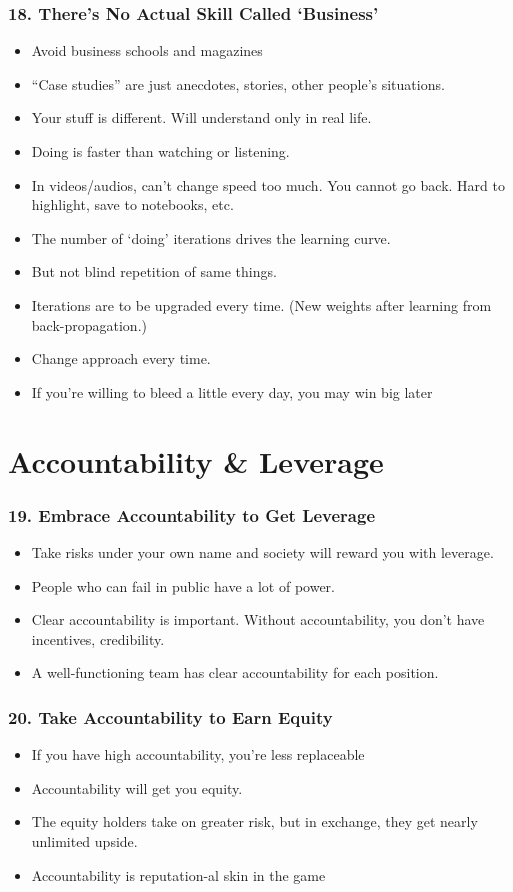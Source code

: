 \begin{frame}[fragile]
\frametitle{18. There's No Actual Skill Called `Business'}
\begin{itemize}
\item Avoid business schools and magazines
\item ``Case studies'' are just anecdotes, stories, other people's situations. 
\item Your stuff is different. Will understand only in real life.
\item Doing is faster than watching or listening. 
\item In videos/audios, can't change speed too much. You cannot go back. Hard to highlight, save to notebooks, etc.
\item The number of `doing' iterations drives the learning curve.
\item But not blind repetition of same things. 
\item Iterations are to be upgraded every time. (New weights after learning from back-propagation.)
\item Change approach every time.
\item If you're willing to bleed a little every day, you may win big later
\end{itemize}
\end{frame}


\section{Accountability \& Leverage}

\begin{frame}[fragile]
\frametitle{19. Embrace Accountability to Get Leverage}
\begin{itemize}
\item Take risks under your own name and society will reward you with leverage.
\item People who can fail in public have a lot of power.
\item Clear accountability is important. Without accountability, you don't have incentives, credibility.
\item A well-functioning team has clear accountability for each position.
\end{itemize}
\end{frame}


\begin{frame}[fragile]
\frametitle{20. Take Accountability to Earn Equity}
\begin{itemize}
\item If you have high accountability, you're less replaceable
\item Accountability will get you equity.
\item The equity holders take on greater risk, but in exchange, they get nearly unlimited upside.
\item Accountability is reputation-al skin in the game
\end{itemize}
\end{frame}

